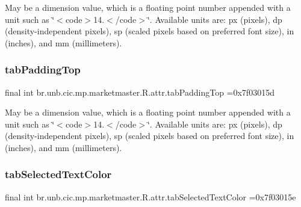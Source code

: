 May be a dimension value, which is a floating point number appended with a unit such as \char`\"{}$<$code$>$14.\+5sp$<$/code$>$\char`\"{}. Available units are\+: px (pixels), dp (density-\/independent pixels), sp (scaled pixels based on preferred font size), in (inches), and mm (millimeters). \mbox{\label{classbr_1_1unb_1_1cic_1_1mp_1_1marketmaster_1_1R_1_1attr_ac45a4461225c4efb0c01d117133e9f3d}} 
\subsubsection{\texorpdfstring{tab\+Padding\+Top}{tabPaddingTop}}
{\footnotesize\ttfamily final int br.\+unb.\+cic.\+mp.\+marketmaster.\+R.\+attr.\+tab\+Padding\+Top =0x7f03015d\hspace{0.3cm}{\ttfamily [static]}}

May be a dimension value, which is a floating point number appended with a unit such as \char`\"{}$<$code$>$14.\+5sp$<$/code$>$\char`\"{}. Available units are\+: px (pixels), dp (density-\/independent pixels), sp (scaled pixels based on preferred font size), in (inches), and mm (millimeters). \mbox{\label{classbr_1_1unb_1_1cic_1_1mp_1_1marketmaster_1_1R_1_1attr_af3baa92e7c4aee228bdad839e61b708f}} 
\subsubsection{\texorpdfstring{tab\+Selected\+Text\+Color}{tabSelectedTextColor}}
{\footnotesize\ttfamily final int br.\+unb.\+cic.\+mp.\+marketmaster.\+R.\+attr.\+tab\+Selected\+Text\+Color =0x7f03015e\hspace{0.3cm}{\ttfamily [static]}}

